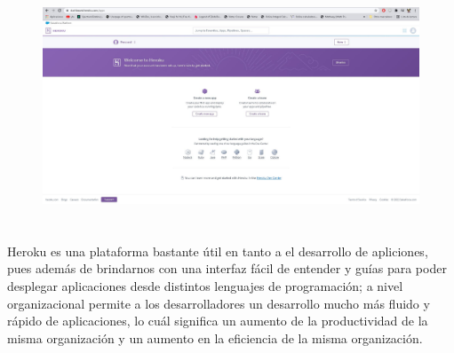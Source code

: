 \documentclass[10pt,a4paper]{article} %
\begin{document}
	\begin{figure}[H]
		\includegraphics[width=\textwidth]{resultado.jpg}
		\centering
		\label{img:resultado}
	\end{figure}
	
	\pagebreak
	
	
	\section{}
	{\large Heroku es una plataforma bastante {\'u}til en tanto a el desarrollo de apliciones, pues adem{\'a}s de brindarnos con una interfaz f{\'a}cil de entender y gu{\'i}as para poder desplegar aplicaciones desde distintos lenguajes de programaci{\'o}n; a nivel organizacional permite a los desarrolladores un desarrollo mucho m{\'a}s fluido y r{\'a}pido de aplicaciones, lo cu{\'a}l significa un aumento de la productividad de la misma organizaci{\'o}n y un aumento en la eficiencia de la misma organizaci{\'o}n.}
	
	
	\pagebreak
	
	
\end{document}
